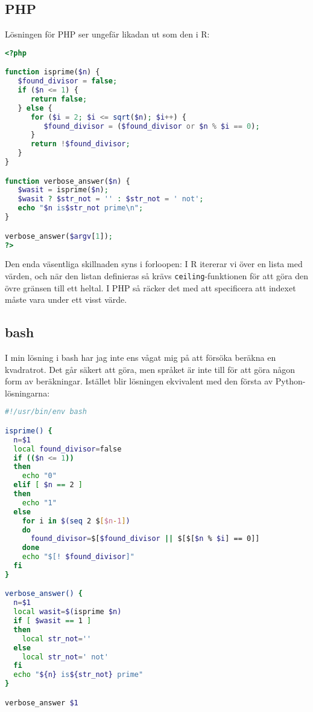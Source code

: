 \documentclass[10pt, twoside,a4paper]{article}
\begin{document}
\newpage
\subsection{PHP}
Lösningen för PHP ser ungefär likadan ut som den i R:
\begin{lstlisting}[language=PHP]
<?php

function isprime($n) {
   $found_divisor = false;
   if ($n <= 1) {
      return false;
   } else {
      for ($i = 2; $i <= sqrt($n); $i++) {
         $found_divisor = ($found_divisor or $n % $i == 0);
      }
      return !$found_divisor;
   }
}

function verbose_answer($n) {
   $wasit = isprime($n);
   $wasit ? $str_not = '' : $str_not = ' not';
   echo "$n is$str_not prime\n";
}

verbose_answer($argv[1]);
?>
\end{lstlisting}
Den enda väsentliga skillnaden syns i forloopen: I R itererar vi över en lista med värden, och när den listan definieras så krävs \verb+ceiling+-funktionen för att göra den övre gränsen till ett heltal. I PHP så räcker det med att specificera att indexet måste vara under ett visst värde.

\newpage
\subsection{bash}
I min lösning i bash har jag inte ens vågat mig på att försöka beräkna en kvadratrot. Det går säkert att göra, men språket är inte till för att göra någon form av beräkningar. Istället blir lösningen ekvivalent med den första av Python-lösningarna:
\begin{lstlisting}[language=bash]
#!/usr/bin/env bash

isprime() {
  n=$1
  local found_divisor=false
  if (($n <= 1))
  then
    echo "0"
  elif [ $n == 2 ]
  then
    echo "1"
  else
    for i in $(seq 2 $[$n-1])
    do
      found_divisor=$[$found_divisor || $[$[$n % $i] == 0]]
    done
    echo "$[! $found_divisor]"
  fi
}

verbose_answer() {
  n=$1
  local wasit=$(isprime $n)
  if [ $wasit == 1 ]
  then
    local str_not=''
  else
    local str_not=' not'
  fi
  echo "${n} is${str_not} prime"
}

verbose_answer $1
\end{lstlisting}
\end{document}
